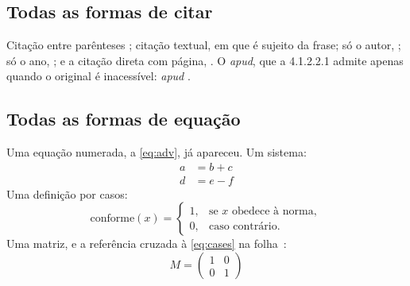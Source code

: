 \documentclass[dsc,pdfa,coorientador,dadoscoleta]{ufrj}
\begin{document}
  \subsection{Todas as formas de citar}
  Citação entre parênteses \citep{book-example}; citação textual, em que
  \citet{article-example} é sujeito da frase; só o autor,
  \citeauthor{book-example}; só o ano, \citeyear{book-example}; e a
  citação direta com página, \citep[p.~37]{m-4234}. O \emph{apud}, que a
  4.1.2.2.1 admite apenas quando o original é inacessível:
  \citeauthor{m-4211} \emph{apud} \citet{book-example}.

  \subsection{Todas as formas de equação}
  Uma equação numerada, a \autoref{eq:adv}, já apareceu. Um sistema:
  \begin{align}
    a &= b + c \label{eq:align1}\\
    d &= e - f \label{eq:align2}
  \end{align}
  Uma definição por casos:
  \begin{equation}\label{eq:cases}
    \mathrm{conforme}(x) = \begin{cases}
      1, & \text{se } x \text{ obedece à norma},\\
      0, & \text{caso contrário.}
    \end{cases}
  \end{equation}
  Uma matriz, e a referência cruzada à \eqref{eq:cases} na
  folha~\pageref{eq:cases}:
  \begin{equation}\label{eq:matriz}
    M = \begin{pmatrix} 1 & 0\\ 0 & 1 \end{pmatrix}
  \end{equation}
\end{document}
